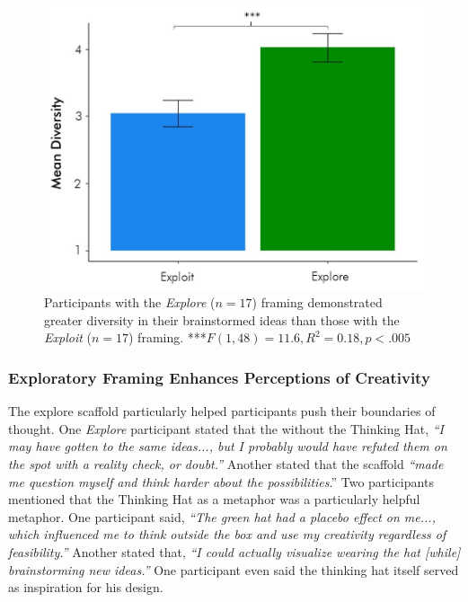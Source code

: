 \begin{figure}[b!]
\centering
  \includegraphics[width=.7\textwidth]{future/figures/diff.jpg}
  \caption{Participants with the \textit{Explore} ($n=17$) framing demonstrated greater diversity in their brainstormed ideas than those with the \textit{Exploit} ($n=17$) framing. ***$F(1,48)=11.6, R^2=0.18, p<.005$
}
  \label{fig:diversity}
\end{figure}

\subsubsection{Exploratory Framing Enhances Perceptions of Creativity}
The explore scaffold particularly helped participants push their boundaries of thought. One \textit{Explore} participant stated that the without the Thinking Hat, \textit{``I may have gotten to the same ideas..., but I probably would have refuted them on the spot with a reality check, or doubt.''} Another stated that the scaffold \textit{``made me question myself and think harder about the possibilities}.'' Two participants mentioned that the Thinking Hat as a metaphor was a particularly helpful metaphor. One participant said, \textit{``The green hat had a placebo effect on me..., which influenced me to think outside the box and use my creativity regardless of feasibility.''} Another stated that, \textit{``I could actually visualize wearing the hat [while] brainstorming new ideas.''} One participant even said the thinking hat itself served as inspiration for his design. 

